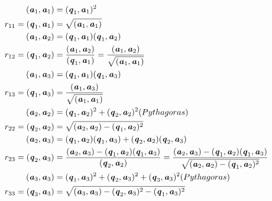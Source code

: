 \begin{align*}
(\textbf{\textit{a}}_{1},\textbf{\textit{a}}_{1})&=(\textbf{\textit{q}}_{1},\textbf{\textit{a}}_{1})^{2} \\
 r_{11}=(\textbf{\textit{q}}_{1},\textbf{\textit{a}}_{1})&=\sqrt{(\textbf{\textit{a}}_{1},\textbf{\textit{a}}_{1})}\\
 (\textbf{\textit{a}}_{1},\textbf{\textit{a}}_{2})&=(\textbf{\textit{q}}_{1},\textbf{\textit{a}}_{1})(\textbf{\textit{q}}_{1},\textbf{\textit{a}}_{2})\\
 r_{12}=(\textbf{\textit{q}}_{1},\textbf{\textit{a}}_{2})&=\frac{(\textbf{\textit{a}}_{1},\textbf{\textit{a}}_{2})}{(\textbf{\textit{q}}_{1},\textbf{\textit{a}}_{1})}=\frac{ (\textbf{\textit{a}}_{1},\textbf{\textit{a}}_{2})}{\sqrt{(\textbf{\textit{a}}_{1},\textbf{\textit{a}}_{1})}}\\
 (\textbf{\textit{a}}_{1},\textbf{\textit{a}}_{3})&=(\textbf{\textit{q}}_{1},\textbf{\textit{a}}_{1})(\textbf{\textit{q}}_{1},\textbf{\textit{a}}_{3})\\
 r_{13}=(\textbf{\textit{q}}_{1},\textbf{\textit{a}}_{3})&=\frac{ (\textbf{\textit{a}}_{1},\textbf{\textit{a}}_{3})}{\sqrt{(\textbf{\textit{a}}_{1},\textbf{\textit{a}}_{1})}}\\
 (\textbf{\textit{a}}_{2},\textbf{\textit{a}}_{2})&=(\textbf{\textit{q}}_{1},\textbf{\textit{a}}_{2})^{2}+(\textbf{\textit{q}}_{2},\textbf{\textit{a}}_{2})^{2}(Pythagoras)\\
 r_{22}=(\textbf{\textit{q}}_{2},\textbf{\textit{a}}_{2})&=\sqrt{(\textbf{\textit{a}}_{2},\textbf{\textit{a}}_{2})-(\textbf{\textit{q}}_{1},\textbf{\textit{a}}_{2})^{2}}\\
 (\textbf{\textit{a}}_{2},\textbf{\textit{a}}_{3})&=(\textbf{\textit{q}}_{1},\textbf{\textit{a}}_{2})(\textbf{\textit{q}}_{1},\textbf{\textit{a}}_{3})+(\textbf{\textit{q}}_{2},\textbf{\textit{a}}_{2})(\textbf{\textit{q}}_{2},\textbf{\textit{a}}_{3})\\
 r_{23}=(\textbf{\textit{q}}_{2},\textbf{\textit{a}}_{3})&=\frac{(\textbf{\textit{a}}_{2},\textbf{\textit{a}}_{3})-(\textbf{\textit{q}}_{1},\textbf{\textit{a}}_{2})(\textbf{\textit{q}}_{1},\textbf{\textit{a}}_{3})}{(\textbf{\textit{q}}_{2},\textbf{\textit{a}}_{2})}=\frac{(\textbf{\textit{a}}_{2},\textbf{\textit{a}}_{3})-(\textbf{\textit{q}}_{1},\textbf{\textit{a}}_{2})(\textbf{\textit{q}}_{1},\textbf{\textit{a}}_{3})}{\sqrt{(\textbf{\textit{a}}_{2},\textbf{\textit{a}}_{2})-(\textbf{\textit{q}}_{1},\textbf{\textit{a}}_{2})^{2}}}\\
 (\textbf{\textit{a}}_{3},\textbf{\textit{a}}_{3})&=(\textbf{\textit{q}}_{1},\textbf{\textit{a}}_{3})^{2}+(\textbf{\textit{q}}_{2},\textbf{\textit{a}}_{3})^{2}+(\textbf{\textit{q}}_{3},\textbf{\textit{a}}_{3})^{2}(Pythagoras)\\
  r_{33}=(\textbf{\textit{q}}_{3},\textbf{\textit{a}}_{3})&=\sqrt{(\textbf{\textit{a}}_{3},\textbf{\textit{a}}_{3})-(\textbf{\textit{q}}_{2},\textbf{\textit{a}}_{3})^{2}-(\textbf{\textit{q}}_{1},\textbf{\textit{a}}_{3})^{2}}
\end{align*}

